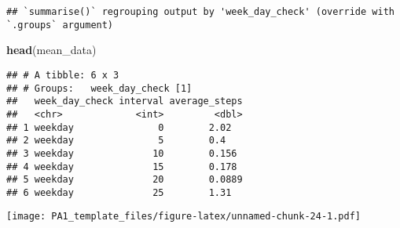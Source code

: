 \documentclass[
]{article}
\newenvironment{Shaded}{\begin{snugshade}}{\end{snugshade}}
\newcommand{\CommentTok}[1]{\textcolor[rgb]{0.56,0.35,0.01}{\textit{#1}}}
\newcommand{\DataTypeTok}[1]{\textcolor[rgb]{0.13,0.29,0.53}{#1}}
\newcommand{\KeywordTok}[1]{\textcolor[rgb]{0.13,0.29,0.53}{\textbf{#1}}}
\newcommand{\NormalTok}[1]{#1}
\newcommand{\OperatorTok}[1]{\textcolor[rgb]{0.81,0.36,0.00}{\textbf{#1}}}
\newcommand{\StringTok}[1]{\textcolor[rgb]{0.31,0.60,0.02}{#1}}
\begin{document}
\begin{verbatim}
## `summarise()` regrouping output by 'week_day_check' (override with `.groups` argument)
\end{verbatim}

\begin{Shaded}
\begin{Highlighting}[]
\KeywordTok{head}\NormalTok{(mean_data)}
\end{Highlighting}
\end{Shaded}

\begin{verbatim}
## # A tibble: 6 x 3
## # Groups:   week_day_check [1]
##   week_day_check interval average_steps
##   <chr>             <int>         <dbl>
## 1 weekday               0        2.02  
## 2 weekday               5        0.4   
## 3 weekday              10        0.156 
## 4 weekday              15        0.178 
## 5 weekday              20        0.0889
## 6 weekday              25        1.31
\end{verbatim}

\begin{Shaded}
\end{Shaded}

\texttt{[image: PA1\_template\_files/figure-latex/unnamed-chunk-24-1.pdf]}
\end{document}

